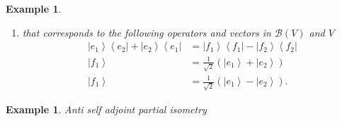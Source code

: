 \documentclass[aps,preprint]{revtex4}%
\newtheorem{example}[theorem]{Example}
\begin{document}
\begin{example}
\begin{enumerate}
\item that corresponds to the following operators and vectors in
$\mathcal{B}\left(  V\right)  $ and $V$
\begin{align}
\left\vert e_{1}\right\rangle \left\langle e_{2}\right\vert +\left\vert
e_{2}\right\rangle \left\langle e_{1}\right\vert  &  =\left\vert
f_{1}\right\rangle \left\langle f_{1}\right\vert -\left\vert f_{2}%
\right\rangle \left\langle f_{2}\right\vert \\
\left\vert f_{1}\right\rangle  &  =\frac{1}{\sqrt{2}}\left(  \left\vert
e_{1}\right\rangle +\left\vert e_{2}\right\rangle \right) \\
\left\vert f_{1}\right\rangle  &  =\frac{1}{\sqrt{2}}\left(  \left\vert
e_{1}\right\rangle -\left\vert e_{2}\right\rangle \right)  .
\end{align}

\end{enumerate}
\end{example}

\begin{example}
\emph{Anti self adjoint }partial isometry
\end{example}
\end{document}
